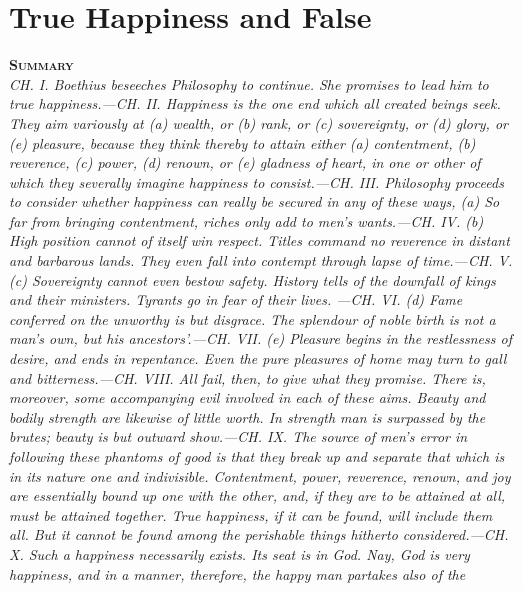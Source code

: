 \documentclass[12pt]{book}
\newenvironment{abstract}%
  {\noindent \textbf{\scshape Summary} \\ \rightskip1in\itshape\small}%
  {\bigskip}
\begin{document}
\chapter{True Happiness and False}

\begin{abstract}
     CH. I. Boethius beseeches Philosophy to continue. She promises to
     lead him to true happiness.---CH. II. Happiness is the one end which
     all created beings seek. They aim variously at (\emph{a}) wealth, or
     (\emph{b}) rank, or (\emph{c}) sovereignty, or (\emph{d}) glory, or (\emph{e})
     pleasure, because they think thereby to attain either (\emph{a})
     contentment, (\emph{b}) reverence, (\emph{c}) power, (\emph{d}) renown, or (\emph{e})
     gladness of heart, in one or other of which they severally imagine
     happiness to consist.---CH. III. Philosophy proceeds to consider
     whether happiness can really be secured in any of these ways, (\emph{a})
     So far from bringing contentment, riches only add to men's
     wants.---CH. IV. (\emph{b}) High position cannot of itself win respect.
     Titles command no reverence in distant and barbarous lands. They
     even fall into contempt through lapse of time.---CH. V. (\emph{c})
     Sovereignty cannot even bestow safety. History tells of the
     downfall of kings and their ministers. Tyrants go in fear of their
     lives. ---CH. VI. (\emph{d}) Fame conferred on the unworthy is but
     disgrace. The splendour of noble birth is not a man's own, but his
     ancestors'.---CH. VII. (\emph{e}) Pleasure begins in the restlessness of
     desire, and ends in repentance. Even the pure pleasures of home may
     turn to gall and bitterness.---CH. VIII. All fail, then, to give
     what they promise. There is, moreover, some accompanying evil
     involved in each of these aims. Beauty and bodily strength are
     likewise of little worth. In strength man is surpassed by the
     brutes; beauty is but outward show.---CH. IX. The source of men's
     error in following these phantoms of good is that \emph{they break up and separate that which is in its nature one and indivisible}.
     Contentment, power, reverence, renown, and joy are essentially
     bound up one with the other, and, if they are to be attained at
     all, must be attained \emph{together}. True happiness, if it can be
     found, will include them all. But it cannot be found among the
     perishable things hitherto considered.---CH. X. Such a happiness
     necessarily exists. Its seat is in God. Nay, God is very happiness,
     and in a manner, therefore, the happy man partakes also of the

\end{abstract}
\end{document}
